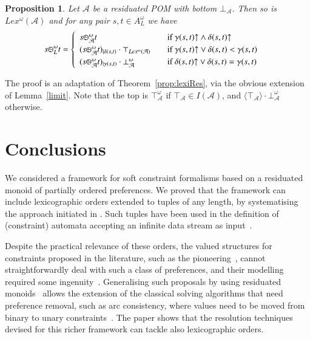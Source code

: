\documentclass[a4paper]{elsarticle}
\newtheorem{proposition}{Proposition}
\newcommand{\1}{\mathbf{1}}
\def\odiv{{ \ominus\hspace{-8pt}:}\;}
\begin{document}

\begin{proposition}\label{prop:lexiResOmega}
	Let $\mathcal{A}$ be a residuated POM with bottom $\bot_\mathcal{A}$.
	Then so is $Lex^\omega(\mathcal{A})$
	and for any pair $s, t \in A^\omega_L$ we have
	\[
	s \odiv^\omega_L t = 	\begin{cases}
	\begin{array}{lcl}
	s \odiv^\omega_\mathcal{A} t & & \mbox{if  } \gamma(s,t){\uparrow} \wedge \delta(s,t){\uparrow} \\
	(s \odiv^\omega_\mathcal{A} t)_{\mid \delta(s,t)} \cdot \top_{Lex^\omega(\mathcal{A})} & &  \mbox{if  } \gamma(s,t){\uparrow} \vee \delta(s,t) < \gamma(s,t) \\
	(s \odiv^\omega_\mathcal{A} t)_{\mid \gamma(s,t)} \cdot \bot^\omega_\mathcal{A} & & \mbox{if  } \delta(s,t){\uparrow} \vee \delta(s,t) = \gamma(s,t)
	\end{array}
	\end{cases}
	\]
\end{proposition}

The proof is an adaptation of Theorem~\ref{prop:lexiRes}, via the obvious extension of Lemma~\ref{limit}.
Note that the top is $\top_\mathcal{A}^\omega$
if $\top_\mathcal{A} \in I(\mathcal{A})$, and  $\langle \top_\mathcal{A} \rangle \cdot \bot_\mathcal{A}^\omega$ otherwise.

\section{Conclusions}\label{sec:conclusion}
We considered a framework for soft constraint formalisms based on a residuated monoid of partially ordered preferences.  
%
We proved that the framework can include lexicographic orders extended to tuples of any length, by systematising the approach initiated in \cite{sca}.
Such tuples have been used in the definition of (constraint) automata accepting an infinite data stream as input~\cite{sca}.

Despite the practical relevance of these orders, the valued structures for constraints proposed in the literature, 
such as the pioneering~\cite{jacm97,schiex}, cannot straightforwardly deal 
with such a class of preferences, and their modelling required some ingenuity~\cite{GadducciHMW13,valuation}. 
%
Generalising such proposals by using residuated monoids~\cite{residuation1} allows the extension of the classical solving algorithms 
that need preference removal, such as arc consistency, where values need to be moved from binary to unary constraints~\cite{ipl}.
%
The paper shows that the resolution techniques devised for this richer framework can tackle also lexicographic orders.
\end{document}
